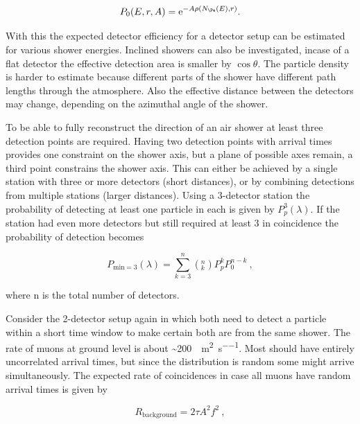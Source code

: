 \begin{equation}
    P_0(E, r, A) = \mathrm{e}^{-A\rho(N_{\Pe}(E), r)} \\ .
\end{equation}

With this the expected detector efficiency for a detector setup can be estimated for various shower energies. Inclined showers can also be investigated, incase of a flat detector the effective detection area is smaller by $\cos \theta$. The particle density is harder to estimate because different parts of the shower have different path lengths through the atmosphere. Also the effective distance between the detectors may change, depending on the azimuthal angle of the shower.

To be able to fully reconstruct the direction of an air shower at least three detection points are required. Having two detection points with arrival times provides one constraint on the shower axis, but a plane of possible axes remain, a third point constrains the shower axis. This can either be achieved by a single station with three or more detectors (short distances), or by combining detections from multiple stations (larger distances). Using a 3-detector station the probability of detecting at least one particle in each is given by $P_p^3(\lambda)$. If the station had even more detectors but still required at least 3 in coincidence the probability of detection becomes

\begin{equation}
    P_{\mathrm{min}=3}(\lambda) = \sum_{k=3}^{n} \left(^n_k\right) P_p^k P_0^{n-k} \ ,
\end{equation}

where n is the total number of detectors.

Consider the 2-detector setup again in which both need to detect a particle within a short time window to make certain both are from the same shower. The rate of muons at ground level is about \SI{~200}{\Pmump\per\meter\squared\per\second}. Most should have entirely uncorrelated arrival times, but since the distribution is random some might arrive simultaneously. The expected rate of coincidences in case all muons have random arrival times is given by

\begin{equation}
    R_{\mathrm{background}} = 2 \tau A^2 f^2 \ ,
\end{equation}

